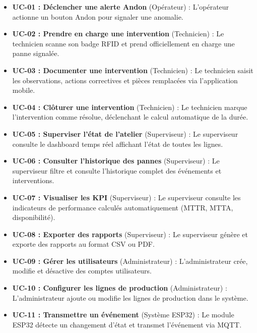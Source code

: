 \begin{itemize}
    \item \textbf{UC-01 : Déclencher une alerte Andon} (Opérateur) : L'opérateur actionne un bouton Andon pour signaler une anomalie.
    
    \item \textbf{UC-02 : Prendre en charge une intervention} (Technicien) : Le technicien scanne son badge RFID et prend officiellement en charge une panne signalée.
    
    \item \textbf{UC-03 : Documenter une intervention} (Technicien) : Le technicien saisit les observations, actions correctives et pièces remplacées via l'application mobile.
    
    \item \textbf{UC-04 : Clôturer une intervention} (Technicien) : Le technicien marque l'intervention comme résolue, déclenchant le calcul automatique de la durée.
    
    \item \textbf{UC-05 : Superviser l'état de l'atelier} (Superviseur) : Le superviseur consulte le dashboard temps réel affichant l'état de toutes les lignes.
    
    \item \textbf{UC-06 : Consulter l'historique des pannes} (Superviseur) : Le superviseur filtre et consulte l'historique complet des événements et interventions.
    
    \item \textbf{UC-07 : Visualiser les KPI} (Superviseur) : Le superviseur consulte les indicateurs de performance calculés automatiquement (MTTR, MTTA, disponibilité).
    
    \item \textbf{UC-08 : Exporter des rapports} (Superviseur) : Le superviseur génère et exporte des rapports au format CSV ou PDF.
    
    \item \textbf{UC-09 : Gérer les utilisateurs} (Administrateur) : L'administrateur crée, modifie et désactive des comptes utilisateurs.
    
    \item \textbf{UC-10 : Configurer les lignes de production} (Administrateur) : L'administrateur ajoute ou modifie les lignes de production dans le système.
    
    \item \textbf{UC-11 : Transmettre un événement} (Système ESP32) : Le module ESP32 détecte un changement d'état et transmet l'événement via MQTT.
\end{itemize}

